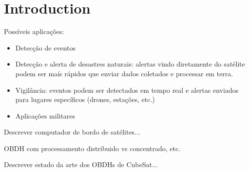 %
%
%
%
%

%
%
%
%
%

\section{Introduction} \label{sec:introduction}


Possíveis aplicações:

\begin{itemize}
    \item Detecção de eventos
    \item Detecção e alerta de desastres naturais: alertas vindo diretamente do satélite podem ser maís rápidos que enviar dados coletados e processar em terra.
    \item Vigilância: eventos podem ser detectados em tempo real e alertas enviados para lugares específicos (drones, estações, etc.)
    \item Aplicações militares
\end{itemize}

Descrever computador de bordo de satélites...

OBDH com processamento distribuido vs concentrado, etc.

Descrever estado da arte dos OBDHs de CubeSat...
